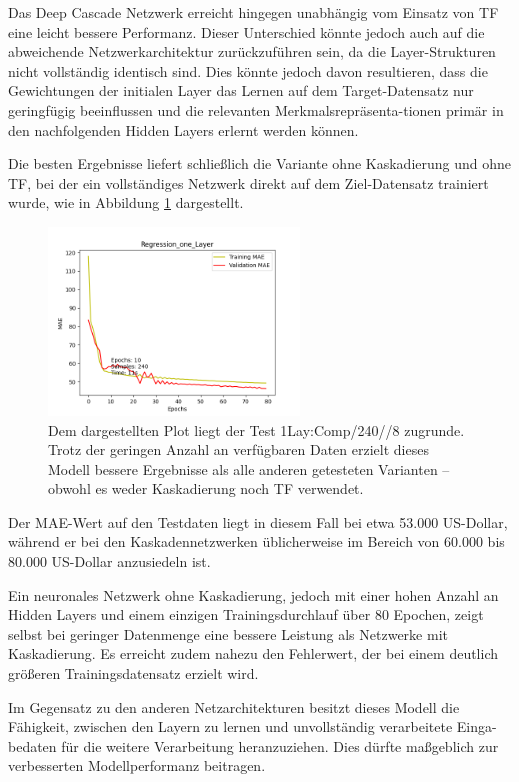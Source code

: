 Das Deep Cascade Netzwerk erreicht hingegen unabhängig vom Einsatz von TF eine leicht bessere Performanz. Dieser Unterschied könnte jedoch auch 
auf die abweichende Netzwerkarchitektur zurückzuführen sein, da die Layer-Strukturen nicht vollständig identisch sind. 
Dies könnte jedoch davon resultieren, dass die Gewichtungen der initialen Layer das Lernen auf dem Target-Datensatz nur geringfügig 
beeinflussen und die relevanten Merkmalsrepräsenta-tionen primär in den nachfolgenden Hidden Layers erlernt werden können.

Die besten Ergebnisse liefert schließlich die Variante ohne Kaskadierung und ohne TF, bei der ein vollständiges Netzwerk direkt 
auf dem Ziel-Datensatz trainiert wurde, wie in Abbildung \ref{fig:smallonlcomp} dargestellt.

\begin{figure}
    \centering
    \includegraphics[height=5cm]{../../Plots/ba_plots/regression_small/onelayer_complete.png}
    \caption{\label{fig:smallonlcomp} 
    \small{Dem dargestellten Plot liegt der Test 1Lay:Comp/240//8 zugrunde. Trotz der geringen Anzahl an verfügbaren Daten erzielt dieses Modell 
    bessere Ergebnisse als alle anderen getesteten Varianten – obwohl es weder Kaskadierung noch TF verwendet.}}
\end{figure}

Der MAE-Wert auf den Testdaten liegt in diesem Fall bei etwa 53.000 US-Dollar, während er bei den Kaskadennetzwerken 
üblicherweise im Bereich von 60.000 bis 80.000 US-Dollar anzusiedeln ist.

Ein neuronales Netzwerk ohne Kaskadierung, jedoch mit einer hohen Anzahl an Hidden Layers und einem einzigen Trainingsdurchlauf über 80 Epochen, 
zeigt selbst bei geringer Datenmenge eine bessere Leistung als Netzwerke mit Kaskadierung. Es erreicht zudem nahezu den Fehlerwert, der bei 
einem deutlich größeren Trainingsdatensatz erzielt wird.

Im Gegensatz zu den anderen Netzarchitekturen besitzt dieses Modell die Fähigkeit, zwischen den Layern zu lernen und unvollständig verarbeitete 
Einga-bedaten für die weitere Verarbeitung heranzuziehen. Dies dürfte maßgeblich zur verbesserten Modellperformanz beitragen.

